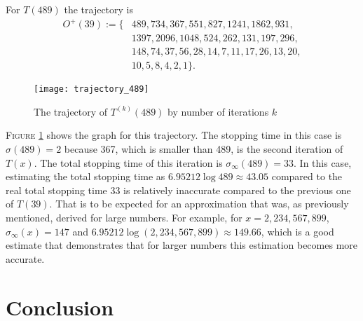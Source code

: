 \documentclass[12pt,a4paper,reqno]{amsart}
\begin{document}
For $T(489)$ the trajectory is 
\begin{align}
    \nonumber
    O^+(39):=\{&489,734,367,551,827,1241,1862,931,\\ \nonumber
               &1397,2096,1048,524,262,131,197,296,\\ \nonumber
               &148,74,37,56,28,14,7,11,17,26,13,20,\\ \nonumber
               &10, 5, 8, 4, 2, 1\}.
\end{align}
\begin{figure}[h]
\texttt{[image: trajectory\_489]}
    \caption{The trajectory of $T^{(k)}(489)$ by number of iterations $k$}
\label{fig:03}
\end{figure}
\textsc{Figure} \ref{fig:03} shows the graph for this trajectory. The stopping
time in this case is $\sigma(489)=2$ because 367, which is smaller than 489, is
the second iteration of $T(x)$. The total stopping time of this iteration is 
$\sigma_{\infty}(489)=33$. In this case, estimating the total stopping time as 
$6.95212 \log 489 \approx 43.05$ compared to the real total stopping time 33 is 
relatively inaccurate compared to the previous one of $T(39)$. That is to be 
expected for an approximation that was, as previously mentioned, derived for 
large numbers. For example, for $x=2,234,567,899$, $\sigma_{\infty}(x)=147$ and 
$6.95212 \log (2,234,567,899) \approx 149.66$, which is a good estimate that
demonstrates that for larger numbers this estimation becomes more accurate.

\section{Conclusion}
\end{document}
